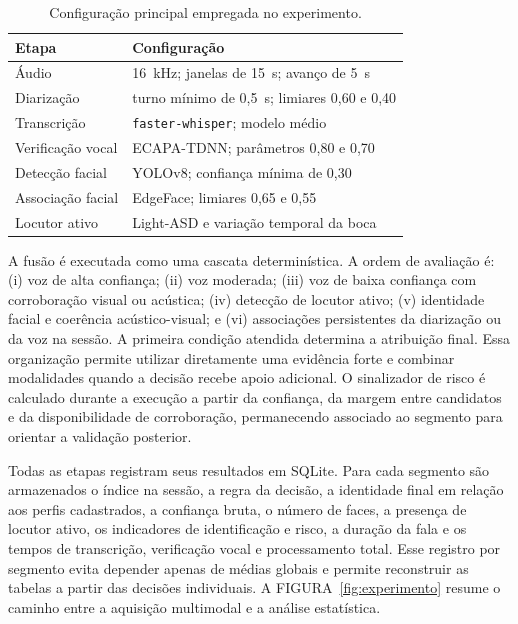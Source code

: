 \documentclass[a4paper,11pt]{article}
\begin{document}
\begin{table}[H]
    \centering
    \caption{Configuração principal empregada no experimento.}
    \label{tab:parametros}
    \footnotesize
    \begin{tabular}{ll}
        \hline
        \textbf{Etapa} & \textbf{Configuração} \\
        \hline
        Áudio & 16~kHz; janelas de 15~s; avanço de 5~s \\
        Diarização & turno mínimo de 0,5~s; limiares 0,60 e 0,40 \\
        Transcrição & \texttt{faster-whisper}; modelo médio \\
        Verificação vocal & ECAPA-TDNN; parâmetros 0,80 e 0,70 \\
        Detecção facial & YOLOv8; confiança mínima de 0,30 \\
        Associação facial & EdgeFace; limiares 0,65 e 0,55 \\
        Locutor ativo & Light-ASD e variação temporal da boca \\
        \hline
    \end{tabular}
\end{table}

A fusão é executada como uma cascata determinística. A ordem de avaliação é: (i) voz de alta confiança; (ii) voz moderada; (iii) voz de baixa confiança com corroboração visual ou acústica; (iv) detecção de locutor ativo; (v) identidade facial e coerência acústico-visual; e (vi) associações persistentes da diarização ou da voz na sessão. A primeira condição atendida determina a atribuição final. Essa organização permite utilizar diretamente uma evidência forte e combinar modalidades quando a decisão recebe apoio adicional. O sinalizador de risco é calculado durante a execução a partir da confiança, da margem entre candidatos e da disponibilidade de corroboração, permanecendo associado ao segmento para orientar a validação posterior.

Todas as etapas registram seus resultados em SQLite. Para cada segmento são armazenados o índice na sessão, a regra da decisão, a identidade final em relação aos perfis cadastrados, a confiança bruta, o número de faces, a presença de locutor ativo, os indicadores de identificação e risco, a duração da fala e os tempos de transcrição, verificação vocal e processamento total. Esse registro por segmento evita depender apenas de médias globais e permite reconstruir as tabelas a partir das decisões individuais. A FIGURA~\ref{fig:experimento} resume o caminho entre a aquisição multimodal e a análise estatística.
\end{document}
